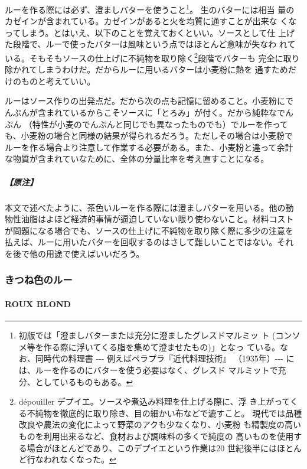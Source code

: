 \documentclass[twoside,12Q,b5j]{escoffierltjsbook}
\newenvironment{recette}{\begin{small}\begin{spacing}{1}\begin{multicols}{2}}{\end{multicols}\end{spacing}\end{small}}
\begin{document}
\begin{recette}
ルーを作る際には必ず、澄ましバターを使うこと\footnote{初版では「澄ましバターまたは充分に澄ましたグレスドマルミッ
  ト (コンソメ等を作る際に浮いてくる脂を集めて澄ませたもの)」となっ
  ている。なお、同時代の料理書 -\/-\/- 例えばペラプラ『近代料理技術』
  （1935年）-\/-\/- には、ルーを作るのにバターを使う必要はなく、グレスド
  マルミットで充分、としているものもある。}。 生のバターには相当
量のカゼインが含まれている。カゼインがあると火を均質に通すことが出来な
くなってしまう。とはいえ、以下のことを覚えておくといい。ソースとして仕
上げた段階で、ルーで使ったバターは風味という点ではほとんど意味が失なわ
れている。そもそもソースの仕上げに不純物を取り除く\footnote{dépouiller
  デプイエ。ソースや煮込み料理を仕上げる際に、浮
  き上がってくる不純物を徹底的に取り除き、目の細かい布などで漉すこと。
  現代では品種改良や農法の変化によって野菜のアクも少なくなり、小麦粉
  も精製度の高いものを利用出来るなど、食材および調味料の多くで純度の
  高いものを使用する場合がほとんどであり、このデプイエという作業は20
  世紀後半にはほとんど行なわれなくなった。}段階でバターも
完全に取り除かれてしまうわけだ。だからルーに用いるバターは小麦粉に熱を
通すためだけのものと考えていい。

ルーはソース作りの出発点だ。だから次の点も記憶に留めること。小麦粉にで
んぷんが含まれているからこそソースに「とろみ」が付く。だから純粋なでん
ぷん （特性が小麦のでんぷんと同じでも異なったものでも）でルーを作って
も、小麦粉の場合と同様の結果が得られるだろう。ただしその場合は小麦粉で
ルーを作る場合より注意して作業する必要がある。また、小麦粉と違って余計
な物質が含まれていなために、全体の分量比率を考え直すことになる。

\subparagraph{【原注】}\label{ux539fux6ce8-6}

本文で述べたように、茶色いルーを作る際には澄ましバターを用いる。他の動
物性油脂はよほど経済的事情が逼迫していない限り使わないこと。材料コスト
が問題になる場合でも、ソースの仕上げに不純物を取り除く際に多少の注意を
払えば、ルーに用いたバターを回収するのはさして難しいことではない。それ
を後で他の用途で使えばいいだろう。

\vspace*{1.7\zw}

\subsubsection{きつね色のルー}\label{ux304dux3064ux306dux8272ux306eux30ebux30fc}

\paragraph{ROUX BLOND}\label{roux-blond}


\end{recette}
\end{document}
